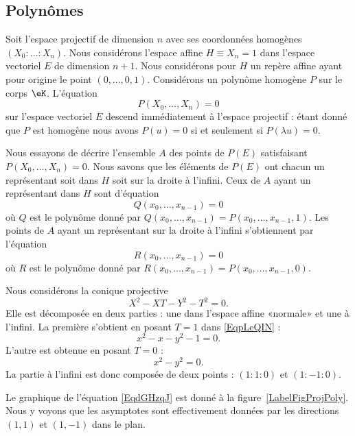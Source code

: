 \subsection{Polynômes}

Soit l'espace projectif de dimension \( n\) avec ses coordonnées homogènes \( (X_0:\ldots :X_n)\). Nous considérons l'espace affine \( H\equiv X_n=1\) dans l'espace vectoriel \( E\) de dimension \( n+1\). Nous considérons pour \( H\) un repère affine ayant pour origine le point \( (0,\ldots, 0,1)\). Considérons un polynôme homogène \( P\) sur le corps \( \eK\). L'équation
\begin{equation}
	P(X_0,\ldots, X_n)=0
\end{equation}
sur l'espace vectoriel \( E\) descend immédiatement à l'espace projectif : étant donné que \( P\) est homogène nous avons \( P(u)=0\) si et seulement si \( P(\lambda u)=0\).

Nous essayons de décrire l'ensemble \( A\) des points de \( P(E)\) satisfaisant \( P(X_0,\ldots, X_n)=0\). Nous savons que les éléments de \( P(E)\) ont chacun un représentant soit dans \( H\) soit sur la droite à l'infini. Ceux de \( A\) ayant un représentant dans \( H\) sont d'équation
\begin{equation}
	Q(x_0,\ldots, x_{n-1})=0
\end{equation}
où \( Q\) est le polynôme donné par \( Q(x_0,\ldots, x_{n-1})=P(x_0,\ldots, x_{n-1},1)\). Les points de \( A\) ayant un représentant sur la droite à l'infini s'obtiennent par l'équation
\begin{equation}
	R(x_0,\ldots, x_{n-1})=0
\end{equation}
où \( R\) est le polynôme donné par \( R(x_0,\ldots, x_{n-1})=P(x_0,\ldots, x_{n-1},0)\).

\begin{example}
	Nous considérons la conique projective
	\begin{equation}    \label{EqpLeQIN}
		X^2-XT-Y^2-T^2=0.
	\end{equation}
	Elle est décomposée en deux parties : une dans l'espace affine «normale» et une à l'infini. La première s'obtient en posant \( T=1\) dans \eqref{EqpLeQIN} :
	\begin{equation}    \label{EqdGHzqJ}
		x^2-x-y^2-1=0.
	\end{equation}
	L'autre est obtenue en posant \( T=0\) :
	\begin{equation}
		x^2-y^2=0.
	\end{equation}
	La partie à l'infini est donc composée de deux points : \( (1:1:0)\) et \( (1:-1:0)\).

	Le graphique de l'équation \eqref{EqdGHzqJ} est donné à la figure~\ref{LabelFigProjPoly}. Nous y voyons que les asymptotes sont effectivement données par les directions \( (1,1)\) et \( (1,-1)\) dans le plan.
	\newcommand{\CaptionFigProjPoly}{Le graphique de \( x^2-x-y^2-1=0\).}
	
\end{example}

